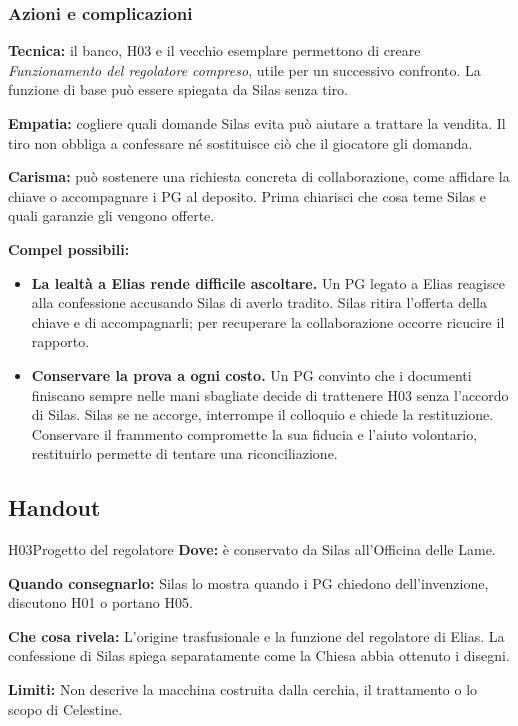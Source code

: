 \documentclass[11pt,a4paper]{article}
\newcommand{\aspect}[1]{\textit{\textcolor{blood}{#1}}}
\begin{document}
\subsubsection{Azioni e complicazioni}
\begin{fatebox}
\textbf{Tecnica:} il banco, H03 e il vecchio esemplare permettono di creare \aspect{Funzionamento del regolatore compreso}, utile per un successivo confronto. La funzione di base può essere spiegata da Silas senza tiro.

\textbf{Empatia:} cogliere quali domande Silas evita può aiutare a trattare la vendita. Il tiro non obbliga a confessare né sostituisce ciò che il giocatore gli domanda.

\textbf{Carisma:} può sostenere una richiesta concreta di collaborazione, come affidare la chiave o accompagnare i PG al deposito. Prima chiarisci che cosa teme Silas e quali garanzie gli vengono offerte.
\end{fatebox}

\textbf{Compel possibili:}
\begin{itemize}
\item \textbf{La lealtà a Elias rende difficile ascoltare.} Un PG legato a Elias reagisce alla confessione accusando Silas di averlo tradito. Silas ritira l'offerta della chiave e di accompagnarli; per recuperare la collaborazione occorre ricucire il rapporto.
\item \textbf{Conservare la prova a ogni costo.} Un PG convinto che i documenti finiscano sempre nelle mani sbagliate decide di trattenere H03 senza l'accordo di Silas. Silas se ne accorge, interrompe il colloquio e chiede la restituzione. Conservare il frammento compromette la sua fiducia e l'aiuto volontario, restituirlo permette di tentare una riconciliazione.
\end{itemize}

\subsection{Handout}
\label{nodo-2-handout}
{}
\begin{handoutbox}{H03}{Progetto del regolatore}
\textbf{Dove:} è conservato da Silas all'Officina delle Lame.

\textbf{Quando consegnarlo:} Silas lo mostra quando i PG chiedono dell'invenzione, discutono H01 o portano H05.

\textbf{Che cosa rivela:} L'origine trasfusionale e la funzione del regolatore di Elias. La confessione di Silas spiega separatamente come la Chiesa abbia ottenuto i disegni.

\textbf{Limiti:} Non descrive la macchina costruita dalla cerchia, il trattamento o lo scopo di Celestine.
\end{handoutbox}
\end{document}
